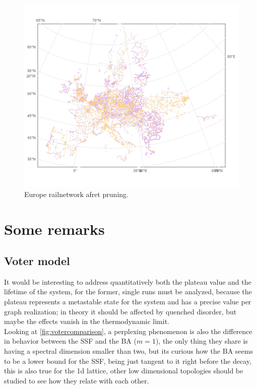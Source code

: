 \begin{appendices}
\begin{figure}[htbp]
\end{figure}
\begin{figure}[htbp]
  \centering
  \includegraphics[width=15cm,keepaspectratio]{images/Europe_pruned.png}
  \caption{Europe railnetwork afret pruning.}
  
\end{figure}
\chapter{Some remarks}
\section{Voter model}
It would be interesting to address quantitatively both the plateau value and the lifetime of the system, for the former, single runs must be analyzed, because the plateau represents a metastable state for the system and has a precise value per graph realization; in theory it should be affected by quenched disorder, but maybe the effects vanish in the thermodynamic limit.\\
Looking at  \ref{fig:votercomparison}, a perplexing phenomenon is also the difference in behavior between the SSF and the BA ($m=1$), the only thing they share is having a spectral dimension smaller than two, but its curious how the BA seems to be a lower bound for the SSF, being just tangent to it right before the decay, this is also true for the 1d lattice, other low dimensional topologies should be studied to see how they relate with each other.\\


\end{appendices}
